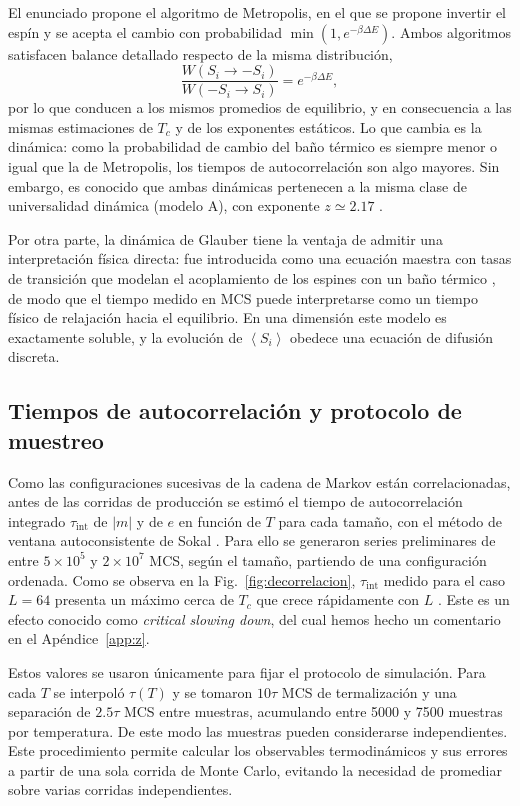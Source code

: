 \documentclass[a4paper,11pt]{article}
\newcommand{\expval}[1]{\left\langle #1 \right\rangle}
\newcommand{\Tc}{T_c}
\begin{document}
El enunciado propone el algoritmo de Metropolis, en el que se propone invertir el espín y se acepta el cambio con probabilidad $\min(1, e^{-\beta \Delta E})$.
Ambos algoritmos satisfacen balance detallado respecto de la misma distribución,
\begin{equation}
  \frac{W(S_i \to -S_i)}{W(-S_i \to S_i)} = e^{-\beta \Delta E} ,
\end{equation}
por lo que conducen a los mismos promedios de equilibrio, y en consecuencia a las mismas estimaciones de $\Tc$ y de los exponentes estáticos.
Lo que cambia es la dinámica: como la probabilidad de cambio del baño térmico es siempre menor o igual que la de Metropolis, los tiempos de autocorrelación son algo mayores.
Sin embargo, es conocido que ambas dinámicas pertenecen a la misma clase de universalidad dinámica (modelo A), con exponente $z \simeq 2.17$ \cite{tauberCriticalDynamicsField2014}.

Por otra parte, la dinámica de Glauber tiene la ventaja de admitir una interpretación física directa: fue introducida como una ecuación maestra con tasas de transición que modelan el acoplamiento de los espines con un baño térmico \cite{glauberTimeDependentStatisticsIsing1963}, de modo que el tiempo medido en MCS puede interpretarse como un tiempo físico de relajación hacia el equilibrio.
En una dimensión este modelo es exactamente soluble, y la evolución de $\expval{S_i}$ obedece una ecuación de difusión discreta.

\subsection{Tiempos de autocorrelación y protocolo de muestreo}
\label{sec:autocorrelacion}
Como las configuraciones sucesivas de la cadena de Markov están correlacionadas, antes de las corridas de producción se estimó el tiempo de autocorrelación integrado $\tau_\mathrm{int}$ de $|m|$ y de $e$ en función de $T$ para cada tamaño, con el método de ventana autoconsistente de Sokal \cite{landauGuideMonteCarlo2020}.
Para ello se generaron series preliminares de entre $5 \times 10^5$ y $2 \times 10^7$ MCS, según el tamaño, partiendo de una configuración ordenada.
Como se observa en la Fig.~\ref{fig:decorrelacion}, $\tau_\mathrm{int}$ medido para el caso $L=64$ presenta un máximo cerca de $\Tc$ que crece rápidamente con $L$ . Este es un efecto conocido como  \textit{critical slowing down}, del cual hemos hecho un comentario en el Apéndice~\ref{app:z}.

Estos valores se usaron únicamente para fijar el protocolo de simulación.
Para cada $T$ se interpoló $\tau(T)$ y se tomaron $10\tau$ MCS de termalización y una separación de $2.5\tau$ MCS entre muestras, acumulando entre 5000 y 7500 muestras por temperatura.
De este modo las muestras pueden considerarse independientes. Este procedimiento permite calcular los observables termodinámicos y sus errores a partir de una sola corrida de Monte Carlo, evitando la necesidad de promediar sobre varias corridas independientes.
\end{document}
